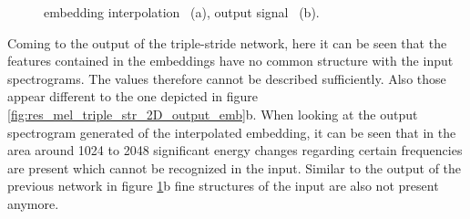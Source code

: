 \begin{figure}[htb!]
    \centering
    \caption{embedding interpolation ~(a), output signal ~(b).}
    \label{fig:res_mel_double_str_2D_inter_output}
\end{figure}

Coming to the output of the triple-stride network, here it can be seen that the features contained in the embeddings have no common structure with the input spectrograms. The values therefore cannot be described sufficiently. Also those appear different to the one depicted in figure \ref{fig:res_mel_triple_str_2D_output_emb}b. When looking at the output spectrogram generated of the interpolated embedding, it can be seen that in the area around 1024 to 2048 significant energy changes regarding certain frequencies are present which cannot be recognized in the input. Similar to the output of the previous network in figure \ref{fig:res_mel_double_str_2D_inter_output}b fine structures of the input are also not present anymore. 

